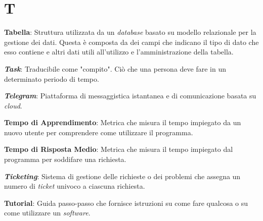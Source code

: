 \documentclass[5pt]{article}
\begin{document}
\pagebreak

\section*{T}
\begin{flushleft}

\textbf{Tabella}: Struttura utilizzata da un \textit{database} basato su modello relazionale per la gestione dei dati. Questa è composta da dei campi che indicano il tipo di dato che esso contiene e altri dati utili all'utilizzo e l'amministrazione della tabella.\newline

\textbf{\textit{Task}}: Traducibile come "compito". Ciò che una persona deve fare in un determinato periodo di tempo.\newline

\textbf{\textit{Telegram}}: Piattaforma di messaggistica istantanea e di comunicazione basata su \textit{cloud}.\newline

\textbf{Tempo di Apprendimento}: Metrica che misura il tempo impiegato da un nuovo utente per comprendere come utilizzare il programma.\newline

\textbf{Tempo di Risposta Medio}: Metrica che misura il tempo impiegato dal programma per soddifare una richiesta.\newline

\textbf{\textit{Ticketing}}: Sistema di gestione delle richieste o dei problemi che assegna un numero di \textit{ticket} univoco a ciascuna richiesta.\newline

\textbf{Tutorial}: Guida passo-passo che fornisce istruzioni su come fare qualcosa o su come utilizzare un \textit{software}.\newline



\end{flushleft}

\pagebreak
\end{document}
